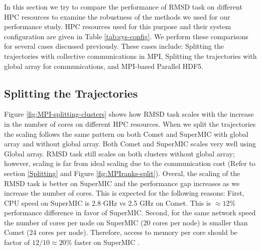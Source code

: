 \label{sec:clusters}
In this section we try to compare the performance of RMSD task on different HPC resources to examine the robustness of the methods we used for our performance study.
HPC resources used for this purpose and their system configuration are given in Table \ref{tab:sys-config}.
We perform these comparisons for several cases discussed previously. 
These cases include: Splitting the trajectories with collective communications in MPI, Splitting the trajectories with global array for communications, and MPI-based Parallel HDF5.

\subsection{Splitting the Trajectories}
Figure \ref{fig:MPI-splitting-clusters} shows how RMSD task scales with the increase in the number of cores on different HPC resources.  
When we split the trajectories the scaling follows the same pattern on both Comet and SuperMIC with global array and without global array.
Both Comet and SuperMIC scales very well using Global array. 
RMSD task still scales on both clusters without global array; however, scaling is far from ideal scaling due to the communication cost (Refer to section \ref{Splitting} and Figure \ref{fig:MPIranks-split}). 
Overal, the scaling of the RMSD task is better on SuperMIC and the performance gap increases as we increase the number of cores.
This is expected for the following reasons:
First, CPU speed on SuperMIC is 2.8 GHz vs 2.5 GHz on Comet. This is $\approx 12\%$ performance difference in favor of SuperMIC. 
Second, for the same network speed the number of cores per node on SuperMIC (20 cores per node) is smaller than Comet (24 cores per node). 
Therefore, access to memory per core should be factor of $12/10 \approx 20\%$ faster on SuperMIC
.

